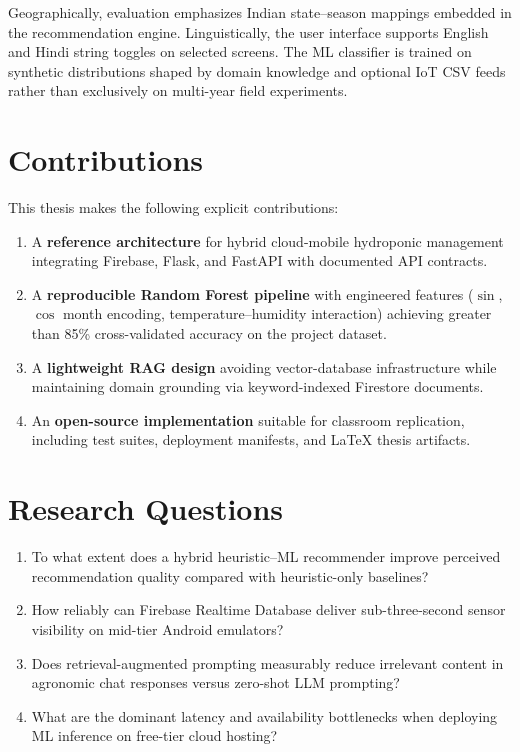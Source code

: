 Geographically, evaluation emphasizes Indian state--season mappings embedded in the recommendation engine. Linguistically, the user interface supports English and Hindi string toggles on selected screens. The ML classifier is trained on synthetic distributions shaped by domain knowledge and optional IoT CSV feeds rather than exclusively on multi-year field experiments.

\section{Contributions}
\label{sec:contributions}

This thesis makes the following explicit contributions:

\begin{enumerate}
  \item A \textbf{reference architecture} for hybrid cloud-mobile hydroponic management integrating Firebase, Flask, and FastAPI with documented API contracts.
  \item A \textbf{reproducible Random Forest pipeline} with engineered features ($\sin$, $\cos$ month encoding, temperature--humidity interaction) achieving greater than 85\% cross-validated accuracy on the project dataset.
  \item A \textbf{lightweight RAG design} avoiding vector-database infrastructure while maintaining domain grounding via keyword-indexed Firestore documents.
  \item An \textbf{open-source implementation} suitable for classroom replication, including test suites, deployment manifests, and LaTeX thesis artifacts.
\end{enumerate}

\section{Research Questions}
\label{sec:research_questions}

\begin{enumerate}
  \item[RQ1.] To what extent does a hybrid heuristic--ML recommender improve perceived recommendation quality compared with heuristic-only baselines?
  \item[RQ2.] How reliably can Firebase Realtime Database deliver sub-three-second sensor visibility on mid-tier Android emulators?
  \item[RQ3.] Does retrieval-augmented prompting measurably reduce irrelevant content in agronomic chat responses versus zero-shot LLM prompting?
  \item[RQ4.] What are the dominant latency and availability bottlenecks when deploying ML inference on free-tier cloud hosting?
\end{enumerate}

